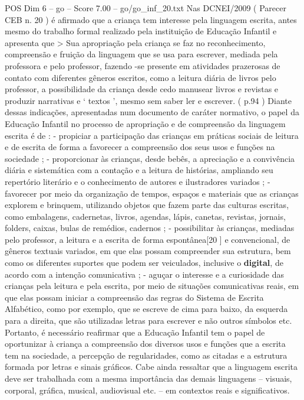 \begin{textsample}{POS Dim 6 – go – Score 7.00 – go/go\_inf\_20.txt}
Nas DCNEI/2009 ( Parecer CEB n. 20 ) é afirmado que a criança tem interesse pela linguagem escrita, antes mesmo do trabalho formal realizado pela instituição de Educação Infantil e apresenta que > Sua apropriação pela criança se faz no reconhecimento, compreensão e fruição da linguagem que se usa para escrever, mediada pela professora e pelo professor, fazendo -se presente em atividades prazerosas de contato com diferentes gêneros escritos, como a leitura diária de livros pelo professor, a possibilidade da criança desde cedo manusear livros e revistas e produzir narrativas e ‘ textos ’, mesmo sem saber ler e escrever. ( p.94 ) Diante dessas indicações, apresentadas num documento de caráter normativo, o papel da Educação Infantil no processo de apropriação e de compreensão da linguagem escrita é de : - propiciar a participação das crianças em práticas sociais de leitura e de escrita de forma a favorecer a compreensão dos seus usos e funções na sociedade ; - proporcionar às crianças, desde bebês, a apreciação e a convivência diária e sistemática com a contação e a leitura de histórias, ampliando seu repertório literário e o conhecimento de autores e ilustradores variados ; - favorecer por meio da organização de tempos, espaços e materiais que as crianças explorem e brinquem, utilizando objetos que fazem parte das culturas escritas, como embalagens, cadernetas, livros, agendas, lápis, canetas, revistas, jornais, folders, caixas, bulas de remédios, cadernos ; - possibilitar às crianças, mediadas pelo professor, a leitura e a escrita de forma espontânea[20 ] e convencional, de gêneros textuais variados, em que elas possam compreender sua estrutura, bem como os diferentes suportes que podem ser veiculados, inclusive o \textbf{digital}, de acordo com a intenção comunicativa ; - aguçar o interesse e a curiosidade das crianças pela leitura e pela escrita, por meio de situações comunicativas reais, em que elas possam iniciar a compreensão das regras do Sistema de Escrita Alfabético, como por exemplo, que se escreve de cima para baixo, da esquerda para a direita, que são utilizadas letras para escrever e não outros símbolos etc.
Portanto, é necessário reafirmar que a Educação Infantil tem o papel de oportunizar à criança a compreensão dos diversos usos e funções que a escrita tem na sociedade, a percepção de regularidades, como as citadas e a estrutura formada por letras e sinais gráficos.
Cabe ainda ressaltar que a linguagem escrita deve ser trabalhada com a mesma importância das demais linguagens – visuais, corporal, gráfica, musical, audiovisual etc. – em contextos reais e significativos.

\end{textsample}
